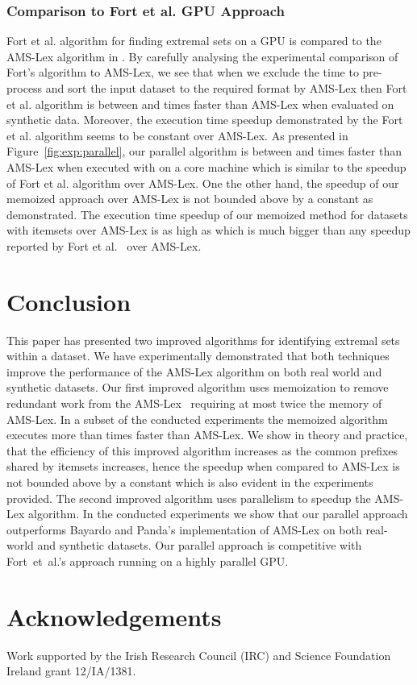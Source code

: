 \documentclass[13pt,a4paper]{article}
\begin{document}
\subsubsection{Comparison to Fort et al. GPU Approach}

Fort et al. algorithm for finding extremal sets on a GPU is compared to the AMS-Lex algorithm in \cite{Fort+13}. By carefully analysing the experimental comparison of Fort's algorithm to AMS-Lex, we see that when we exclude the time to pre-process and sort the input dataset to the required format by AMS-Lex then Fort et al. algorithm is between  and  times faster than AMS-Lex when evaluated on synthetic data. Moreover, the execution time speedup demonstrated by the Fort et al. algorithm seems to be constant over AMS-Lex. As presented in Figure~\ref{fig:exp:parallel}, our parallel algorithm is between  and  times faster than AMS-Lex when executed with  on a  core machine which is similar to the speedup of Fort et al. algorithm over AMS-Lex. One the other hand, the speedup of our memoized approach over AMS-Lex is not bounded above by a constant as demonstrated. The execution time speedup of our memoized method for datasets with  itemsets over AMS-Lex is as high as  which is much bigger than any speedup reported by Fort et al.~\cite{Fort+13} over AMS-Lex. 



\section{Conclusion}
\label{sec:conclusion}

This paper has presented two improved algorithms for identifying extremal sets within a dataset. We have experimentally demonstrated that both techniques improve the performance of the AMS-Lex algorithm on both real world and synthetic datasets. Our first improved algorithm uses memoization to remove redundant work from the AMS-Lex~\cite{BayardoPanda11} requiring at most twice the memory of AMS-Lex. In a subset of the conducted experiments the memoized algorithm executes more than  times faster than AMS-Lex. We show in theory and practice, that the efficiency of this improved algorithm increases as the common prefixes shared by itemsets increases, hence the speedup when compared to AMS-Lex is not bounded above by a constant which is also evident in the experiments provided. The second improved algorithm uses parallelism to speedup the AMS-Lex algorithm. In the conducted experiments we show that our parallel approach outperforms Bayardo and Panda's implementation of AMS-Lex on both real-world and synthetic datasets. Our parallel approach is competitive with Fort~et~al.'s approach running on a highly parallel GPU.


\section{Acknowledgements}
Work supported by the Irish Research Council (IRC) and Science Foundation Ireland grant 12/IA/1381.







\end{document}
